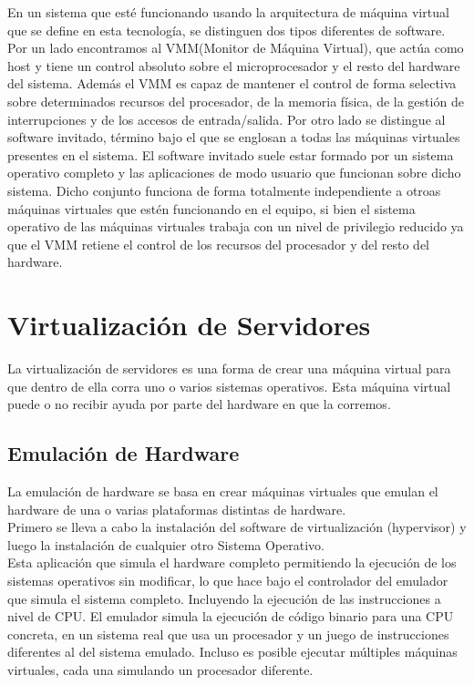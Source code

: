 \documentclass[10pt,a4paper,spanish]{report}
\begin{document}
  \noindent
  En un sistema que esté funcionando usando la arquitectura de máquina virtual que se define en esta tecnología, se distinguen dos tipos diferentes de software. Por un lado encontramos al VMM(Monitor de Máquina Virtual), que actúa como host y tiene un control absoluto sobre el microprocesador y el resto del hardware del sistema. Además el VMM es capaz de mantener el control de forma selectiva sobre determinados recursos del procesador, de la memoria física, de la gestión de interrupciones y de los accesos de entrada/salida. Por otro lado se distingue al software invitado, término bajo el que se englosan a todas las máquinas virtuales presentes en el sistema. El software invitado suele estar formado por un sistema operativo completo y las aplicaciones de modo usuario que funcionan sobre dicho sistema. Dicho conjunto funciona de forma totalmente independiente a otroas máquinas virtuales que estén funcionando en el equipo, si bien el sistema operativo de las máquinas virtuales trabaja con un nivel de privilegio reducido ya que el VMM retiene el control de los recursos del procesador y del resto del hardware. \\

  \chapter{Virtualización de Servidores}

  \noindent
  La virtualización de servidores es una forma de crear una máquina virtual para que dentro de ella corra uno o varios sistemas operativos. Esta máquina virtual puede o no recibir ayuda por parte del hardware en que la corremos.

  \section{Emulación de Hardware}

  \noindent
  La emulación de hardware se basa en crear máquinas virtuales que emulan el hardware de una o varias plataformas distintas de hardware. \\

  \noindent
  Primero se lleva a cabo la instalación del software de virtualización (hypervisor) y luego la instalación de cualquier otro Sistema Operativo. \\

  \noindent
  Esta aplicación que simula el hardware completo permitiendo la ejecución de los sistemas operativos sin modificar, lo que hace bajo el controlador del emulador que simula el sistema completo. Incluyendo la ejecución de las instrucciones a nivel de CPU. El emulador simula la ejecución de código binario para una CPU concreta, en un sistema real que usa un procesador y un juego de instrucciones diferentes al del sistema emulado. Incluso es posible ejecutar múltiples máquinas virtuales, cada una simulando un procesador diferente. \\
\end{document}
